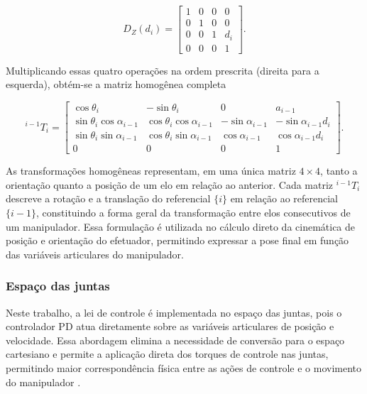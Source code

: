 \begin{equation}
D_Z(d_i) =
\begin{bmatrix}
1 & 0 & 0 & 0 \\
0 & 1 & 0 & 0 \\
0 & 0 & 1 & d_i \\
0 & 0 & 0 & 1
\end{bmatrix}.
\end{equation}

Multiplicando essas quatro operações na ordem prescrita (direita para a esquerda), obtém-se a matriz homogênea completa \cite{craig2005}

\begin{equation}
    \label{eq:transf_homogenea_geral_Craig}
^{i-1}T_i =
\begin{bmatrix}
\cos\theta_i & -\sin\theta_i & 0 & a_{i-1} \\
\sin\theta_i\cos\alpha_{i-1} &
\cos\theta_i\cos\alpha_{i-1} &
-\sin\alpha_{i-1} &
-\sin\alpha_{i-1}d_i \\
\sin\theta_i\sin\alpha_{i-1} &
\cos\theta_i\sin\alpha_{i-1} &
\cos\alpha_{i-1} &
\cos\alpha_{i-1}d_i \\
0 & 0 & 0 & 1
\end{bmatrix}.
\end{equation}

As transformações homogêneas representam, em uma única matriz $4 \times 4$, tanto a orientação quanto a posição de um elo em relação ao anterior.
Cada matriz ${}^{i-1}T_i$ descreve a rotação e a translação do referencial $\{i\}$ em relação ao referencial $\{i-1\}$, constituindo a forma geral da transformação entre elos consecutivos de um manipulador.
Essa formulação é utilizada no cálculo direto da cinemática de posição e orientação do efetuador, permitindo expressar a pose final em função das variáveis articulares do manipulador.

\subsubsection{Espaço das juntas}

Neste trabalho, a lei de controle é implementada no espaço das juntas, pois o controlador PD atua diretamente sobre as variáveis articulares de posição e velocidade.
Essa abordagem elimina a necessidade de conversão para o espaço cartesiano e permite a aplicação direta dos torques de controle nas juntas, permitindo maior correspondência física entre as ações de controle e o movimento do manipulador \cite{craig2005}.